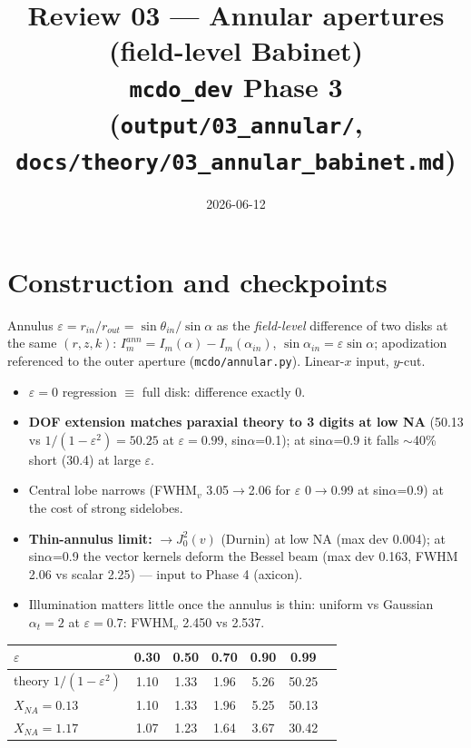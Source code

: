 \documentclass[10pt]{article}
\title{\vspace{-1.2cm}\textbf{Review 03 --- Annular apertures (field-level Babinet)}\\
\large \texttt{mcdo\_dev} Phase 3 \quad(\texttt{output/03\_annular/},
\texttt{docs/theory/03\_annular\_babinet.md})}
\author{}
\date{2026-06-12}
\begin{document}
\maketitle
\vspace{-1.1cm}

\section*{Construction and checkpoints}

Annulus $\varepsilon=r_{in}/r_{out}=\sin\theta_{in}/\sin\alpha$ as the
\emph{field-level} difference of two disks at the same $(r,z,k)$:
$I_m^{ann}=I_m(\alpha)-I_m(\alpha_{in})$, $\sin\alpha_{in}=\varepsilon\sin\alpha$;
apodization referenced to the outer aperture
(\texttt{mcdo/annular.py}). Linear-$x$ input, $y$-cut.

\begin{itemize}\itemsep1pt
\item $\varepsilon=0$ regression $\equiv$ full disk: difference exactly 0.
\item \textbf{DOF extension matches paraxial theory to 3 digits at low NA}
  (50.13 vs $1/(1-\varepsilon^2)=50.25$ at $\varepsilon=0.99$, sin$\alpha$=0.1);
  at sin$\alpha$=0.9 it falls $\sim$40\% short (30.4) at large $\varepsilon$.
\item Central lobe narrows (FWHM$_v$ 3.05$\to$2.06 for $\varepsilon$ 0$\to$0.99
  at sin$\alpha$=0.9) at the cost of strong sidelobes.
\item \textbf{Thin-annulus limit:} $\to J_0^2(v)$ (Durnin) at low NA
  (max dev 0.004); at sin$\alpha$=0.9 the vector kernels deform the Bessel
  beam (max dev 0.163, FWHM 2.06 vs scalar 2.25) --- input to Phase 4 (axicon).
\item Illumination matters little once the annulus is thin: uniform vs
  Gaussian $\alpha_t{=}2$ at $\varepsilon=0.7$: FWHM$_v$ 2.450 vs 2.537.
\end{itemize}

\begin{center}
\small
\begin{tabular}{lcccccc}
\toprule
$\varepsilon$ & 0.30 & 0.50 & 0.70 & 0.90 & 0.99\\
\midrule
theory $1/(1-\varepsilon^2)$ & 1.10 & 1.33 & 1.96 & 5.26 & 50.25\\
$X_{NA}=0.13$ & 1.10 & 1.33 & 1.96 & 5.25 & 50.13\\
$X_{NA}=1.17$ & 1.07 & 1.23 & 1.64 & 3.67 & 30.42\\
\bottomrule
\end{tabular}
\end{center}
\end{document}
